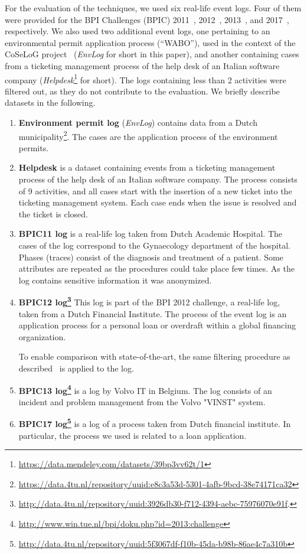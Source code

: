 For the evaluation of the techniques, we used six real-life event logs. Four of them were provided for the BPI Challenges (BPIC) 2011~\cite{bpichallenge2011}, 2012~\cite{bpichallenge2012}, 2013~\cite{bpichallenge2013}, and 2017~\cite{bpichallenge2017}, respectively. We also used two additional event logs, one pertaining to an environmental permit application process (``WABO''), used in the context of the CoSeLoG project~\cite{EnvironmentalLog} (\emph{EnvLog} for short in this paper), and another containing cases from a ticketing management process of the help desk of an Italian software company (\emph{Helpdesk}\footnote{\url{https://data.mendeley.com/datasets/39bp3vv62t/1}} for short). The logs containing less than 2 activities were filtered out, as they do not contribute to the evaluation. We briefly describe datasets in the following.


\begin{enumerate}
	\item \textbf{Environment permit log} (\emph{EnvLog}) contains data from a Dutch municipality\footnote{\url{https://data.4tu.nl/repository/uuid:e8c3a53d-5301-4afb-9bcd-38e74171ca32}}. The cases are the application process of the environment permits.
	\item \textbf{Helpdesk} is a dataset containing events from a ticketing management process of the help desk of an Italian software company. The process consists of 9 activities, and all cases start with the insertion of a new ticket into the ticketing management system. Each case ends when the issue is resolved and the ticket is closed.
	\item \textbf{BPIC11 log} is a real-life log taken from Dutch Academic Hospital. The cases of the log correspond to the Gynaecology department of the hospital. Phases (traces) consist of the diagnosis and treatment of a patient. Some attributes are repeated as the procedures could take place few times. As the log contains sensitive information it was anonymized.
	\item \textbf{BPIC12 log\footnote{\url{http://data.4tu.nl/repository/uuid:3926db30-f712-4394-aebc-75976070e91f}.}} This log is part of the BPI 2012 challenge, a real-life log, taken from a Dutch Financial Institute. The process of the event log is an application process for a personal loan or overdraft within a global financing organization.  
	
	To enable comparison with state-of-the-art, the same filtering procedure as described~\cite{niek96732,breuker2016comprehensible,evermann} is applied to the log. 
	
	\item \textbf{BPIC13 log\footnote{\url{http://www.win.tue.nl/bpi/doku.php?id=2013:challenge}}} is a log by Volvo IT in Belgium. The log consists of an incident and problem management from the Volvo "VINST" system.   
	
	\item \textbf{BPIC17 log\footnote{\url{http://data.4tu.nl/repository/uuid:5f3067df-f10b-45da-b98b-86ae4c7a310b}}} is a log of a process taken from Dutch financial institute. In particular, the process we used is related to a loan application. 
	
\end{enumerate}

